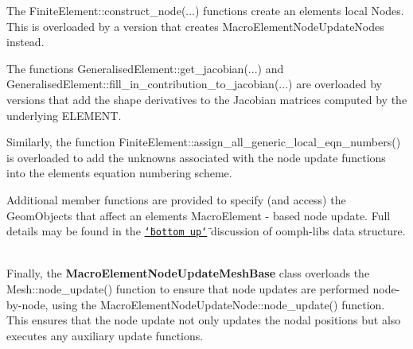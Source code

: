 \begin{DoxyItemize}
\begin{DoxyItemize}
\item The {\ttfamily Finite\+Element\+::construct\+\_\+node}(...) functions create an element\textquotesingle{}s local {\ttfamily Nodes}. This is overloaded by a version that creates {\ttfamily Macro\+Element\+Node\+Update\+Nodes} instead. ~\newline
~\newline

\item The functions {\ttfamily Generalised\+Element\+::get\+\_\+jacobian}(...) and {\ttfamily Generalised\+Element\+::fill\+\_\+in\+\_\+contribution\+\_\+to\+\_\+jacobian}(...) are overloaded by versions that add the shape derivatives to the Jacobian matrices computed by the underlying E\+L\+E\+M\+E\+NT. ~\newline
~\newline

\item Similarly, the function {\ttfamily Finite\+Element\+::assign\+\_\+all\+\_\+generic\+\_\+local\+\_\+eqn\+\_\+numbers()} is overloaded to add the unknowns associated with the node update functions into the element\textquotesingle{}s equation numbering scheme. ~\newline
~\newline

\end{DoxyItemize}Additional member functions are provided to specify (and access) the {\ttfamily Geom\+Objects} that affect an element\textquotesingle{}s {\ttfamily Macro\+Element} -\/ based node update. Full details may be found in the \href{../../../the_data_structure/html/index.html}{\tt \char`\"{}bottom
  up\char`\"{}} discussion of {\ttfamily oomph-\/lib\textquotesingle{}s} data structure. ~\newline
~\newline

\item Finally, the {\bfseries {\ttfamily Macro\+Element\+Node\+Update\+Mesh\+Base}} class overloads the {\ttfamily Mesh\+::node\+\_\+update()} function to ensure that node updates are performed node-\/by-\/node, using the {\ttfamily Macro\+Element\+Node\+Update\+Node\+::node\+\_\+update()} function. This ensures that the node update not only updates the nodal positions but also executes any auxiliary update functions.
\end{DoxyItemize}

